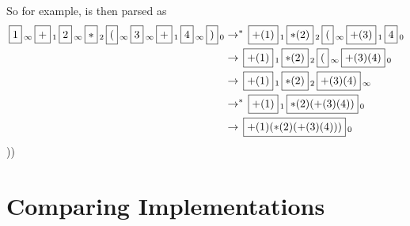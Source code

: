 \documentclass{llncs}
\begin{document}
So for example,  is then parsed as
\begin{align*}
    \mb1_\infty \mb+_1 \mb2_\infty \mb*_2 \mb(_\infty \mb3_\infty \mb+_1 \mb4_\infty \mb)_0 &\to^* \mb{+(1)}_1 \mb{*(2)}_2 \mb(_\infty \mb{+(3)}_1 \mb{4}_0\\
    &\to \mb{+(1)}_1 \mb{*(2)}_2 \mb(_\infty \mb{+(3)(4)}_0\\
    &\to \mb{+(1)}_1 \mb{*(2)}_2 \mb{+(3)(4)}_\infty\\
    &\to^* \mb{+(1)}_1 \mb{*(2)(+(3)(4))}_0\\
    &\to \mb{+(1)(*(2)(+(3)(4)))}_0
\end{align*}
\gobble)\gobble)


\section{Comparing Implementations}
\end{document}
